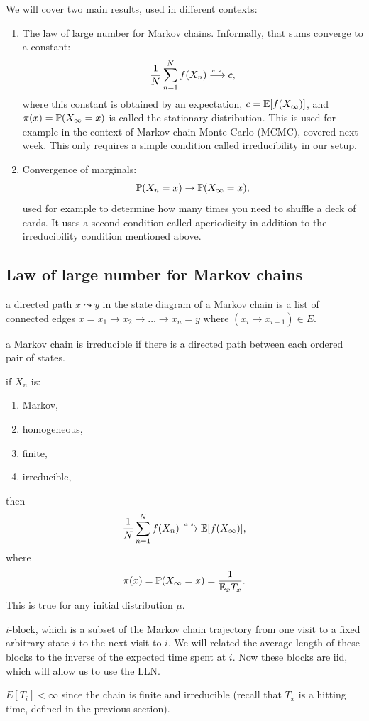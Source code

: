 \documentclass{article}
\begin{document}
We will cover two main results, used in different contexts:
\begin{enumerate}
  \item The law of large number for Markov chains. Informally, that sums converge to a constant: \[ \frac{1}{N} \sum_{n=1}^N f(X_n) \ascv c,\]where this constant is obtained by an expectation, $c = \E[f(X_\infty)]$, and $\pi(x) = \P(X_\infty = x)$ is called the stationary distribution. This is used for example in the context of Markov chain Monte Carlo (MCMC), covered next week. This only requires a simple condition called irreducibility in our setup.
  \item Convergence of marginals: \[ \P(X_n = x) \to \P(X_\infty = x), \]used for example to determine how many times you need to shuffle a deck of cards. It uses a second condition called aperiodicity in addition to the irreducibility condition mentioned above.
\end{enumerate}


\subsection{Law of large number for Markov chains}

 a directed path $x \leadsto y$ in the state diagram of a Markov chain is a list of connected edges $x = x_1 \to x_2 \to \dots \to x_n = y$ where $(x_i \to x_{i+1}) \in E$.

 a Markov chain is irreducible if there is a directed path between each ordered pair of states.

 if $X_n$ is:
\begin{enumerate}
  \item Markov,
  \item homogeneous,
  \item finite, 
  \item irreducible,
\end{enumerate}
then \[ \frac{1}{N} \sum_{n=1}^N f(X_n) \ascv \E[f(X_\infty)],\]
where \[\pi(x) = \P(X_\infty = x) = \frac{1}{\E_x T_x}. \] This is true for any initial distribution $\mu$.

 $i$-block, which is a subset of the Markov chain trajectory from one visit to a fixed arbitrary state $i$ to the next visit to $i$. We will related the average length of these blocks to the inverse of the expected time spent at $i$. Now these blocks are iid, which will allow us to use the LLN.

 $E[T_i] < \infty$ since the chain is finite and irreducible (recall that $T_x$ is a hitting time, defined in the previous section).
\end{document}
